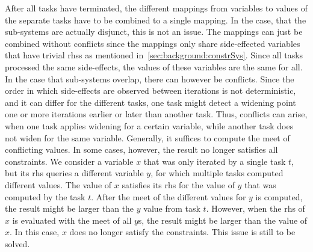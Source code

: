     After all tasks have terminated, the different mappings from variables to values of the separate tasks have to be combined to a single mapping. In the case, that the sub-systems are actually disjunct, this is not an issue. The mappings can just be combined without conflicts since the mappings only share side-effected variables that have trivial \acp{rhs} as mentioned in~\autoref{sec:background:constrSys}. Since all tasks processed the same side-effects, the values of these variables are the same for all.
    In the case that sub-systems overlap, there can however be conflicts. Since the order in which side-effects are observed between iterations is not deterministic, and it can differ for the different tasks, one task might detect a widening point one or more iterations earlier or later than another task. Thus, conflicts can arise, when one task applies widening for a certain variable, while another task does not widen for the same variable. Generally, it suffices to compute the meet of conflicting values. In some cases, however, the result no longer satisfies all constraints. We consider a variable $x$ that was only iterated by a single task $t$, but its \ac{rhs} queries a different variable $y$, for which multiple tasks computed different values. The value of $x$ satisfies its \ac{rhs} for the value of $y$ that was computed by the task $t$. After the meet of the different values for $y$ is computed, the result might be larger than the $y$ value from task $t$. However, when the \ac{rhs} of $x$ is evaluated with the meet of all $y$s, the result might be larger than the value of $x$. In this case, $x$ does no longer satisfy the constraints. This issue is still to be solved.
